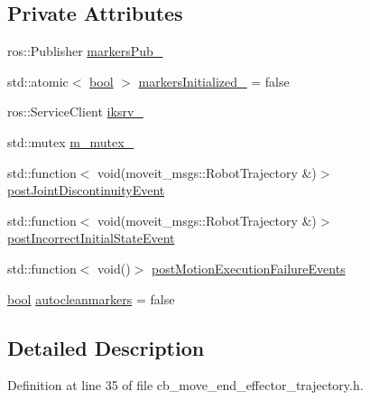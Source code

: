 \subsection*{Private Attributes}
\begin{DoxyCompactItemize}
\item 
ros\+::\+Publisher \hyperlink{classcl__move__group__interface_1_1CbMoveEndEffectorTrajectory_aabc2216b2d8625fecd83c5ec69928e63}{markers\+Pub\+\_\+}
\item 
std\+::atomic$<$ \hyperlink{classbool}{bool} $>$ \hyperlink{classcl__move__group__interface_1_1CbMoveEndEffectorTrajectory_ac140a7f0adfb20f1e2900a5c8cd2ca5b}{markers\+Initialized\+\_\+} = false
\item 
ros\+::\+Service\+Client \hyperlink{classcl__move__group__interface_1_1CbMoveEndEffectorTrajectory_a8a2e2225a5b53325241e45e4e28fa3a7}{iksrv\+\_\+}
\item 
std\+::mutex \hyperlink{classcl__move__group__interface_1_1CbMoveEndEffectorTrajectory_a2a98ef725cb3fc7f61654d3d6a2066bb}{m\+\_\+mutex\+\_\+}
\item 
std\+::function$<$ void(moveit\+\_\+msgs\+::\+Robot\+Trajectory \&)$>$ \hyperlink{classcl__move__group__interface_1_1CbMoveEndEffectorTrajectory_a308331beab9b2ec0eae72fa56fa999c9}{post\+Joint\+Discontinuity\+Event}
\item 
std\+::function$<$ void(moveit\+\_\+msgs\+::\+Robot\+Trajectory \&)$>$ \hyperlink{classcl__move__group__interface_1_1CbMoveEndEffectorTrajectory_a6180230347c922fa0d85f514ce5029df}{post\+Incorrect\+Initial\+State\+Event}
\item 
std\+::function$<$ void()$>$ \hyperlink{classcl__move__group__interface_1_1CbMoveEndEffectorTrajectory_a72c4a469b70617dc5ea75e225a013582}{post\+Motion\+Execution\+Failure\+Events}
\item 
\hyperlink{classbool}{bool} \hyperlink{classcl__move__group__interface_1_1CbMoveEndEffectorTrajectory_a790c30b94509dc6f4d0064f6356a04db}{autocleanmarkers} = false
\end{DoxyCompactItemize}


\subsection{Detailed Description}


Definition at line 35 of file cb\+\_\+move\+\_\+end\+\_\+effector\+\_\+trajectory.\+h.



